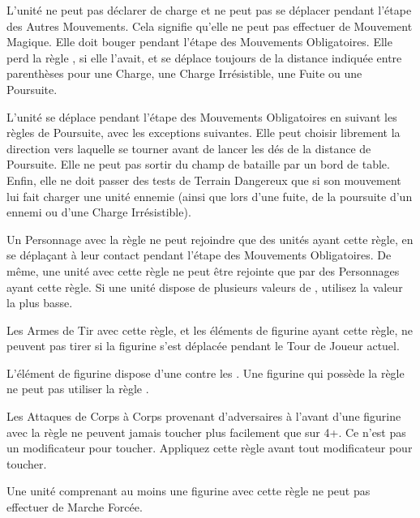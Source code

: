 L'unité ne peut pas déclarer de charge et ne peut pas se déplacer pendant l'étape des Autres Mouvements. Cela signifie qu'elle ne peut pas effectuer de Mouvement Magique. Elle doit bouger pendant l'étape des Mouvements Obligatoires. Elle perd la règle \swiftstride{}, si elle l'avait, et se déplace toujours de la distance indiquée entre parenthèses pour une Charge, une Charge Irrésistible, une Fuite ou une Poursuite.

L'unité se déplace pendant l'étape des Mouvements Obligatoires en suivant les règles de Poursuite, avec les exceptions suivantes. Elle peut choisir librement la direction vers laquelle se tourner avant de lancer les dés de la distance de Poursuite. Elle ne peut pas sortir du champ de bataille par un bord de table. Enfin, elle ne doit passer des tests de Terrain Dangereux que si son mouvement lui fait charger une unité ennemie (ainsi que lors d'une fuite, de la poursuite d'un ennemi ou d'une Charge Irrésistible).

Un Personnage avec la règle \randommovement{} ne peut rejoindre que des unités ayant cette règle, en se déplaçant à leur contact pendant l'étape des Mouvements Obligatoires. De même, une unité avec cette règle ne peut être rejointe que par des Personnages ayant cette règle. Si une unité dispose de plusieurs valeurs de \randommovement{}, utilisez la valeur la plus basse.


Les Armes de Tir avec cette règle, et les éléments de figurine ayant cette règle, ne peuvent pas tirer si la figurine s'est déplacée pendant le Tour de Joueur actuel.


L'élément de figurine dispose d'une  contre les \flamingattacks{}. Une figurine qui possède la règle \fireborn{} ne peut pas utiliser la règle \regeneration{}.


Les Attaques de Corps à Corps provenant d'adversaires à l'avant d'une figurine avec la règle \parry{} ne peuvent jamais toucher plus facilement que sur 4+. Ce n'est pas un modificateur pour toucher. Appliquez cette règle avant tout modificateur pour toucher.


Une unité comprenant au moins une figurine avec cette règle ne peut pas effectuer de Marche Forcée.

